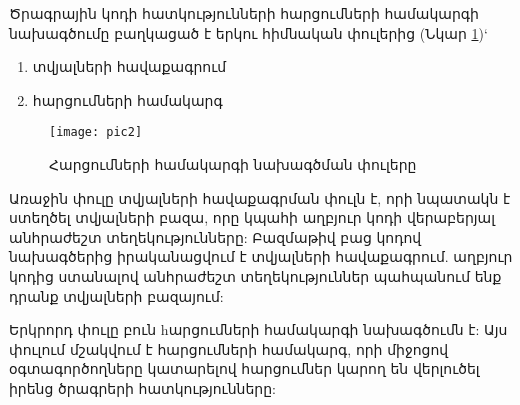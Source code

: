     {
        Ծրագրային կոդի հատկությունների հարցումների համակարգի նախագծումը բաղկացած է երկու հիմնական փուլերից (Նկար \ref{fig:figure2})`
        \begin{enumerate}
            \item տվյալների հավաքագրում
            \item հարցումների համակարգ
        \end{enumerate}

        \begin{figure}[h]
                \centering
                \texttt{[image: pic2]}
                \caption{Հարցումների համակարգի նախագծման փուլերը}
                \label{fig:figure2}
        \end{figure}

        Առաջին փուլը տվյալների հավաքագրման փուլն է, որի նպատակն է ստեղծել տվյալների բազա, որը կպահի աղբյուր կոդի
        վերաբերյալ անհրաժեշտ տեղեկությունները:
        Բազմաթիվ բաց կոդով նախագծերից իրականացվում է տվյալների հավաքագրում.
        աղբյուր կոդից ստանալով անհրաժեշտ տեղեկություններ պահպանում ենք դրանք տվյալների բազայում:

        Երկրորդ փուլը բուն hարցումների համակարգի նախագծումն է: Այս փուլում մշակվում է հարցումների համակարգ, որի միջոցով
        օգտագործողները կատարելով հարցումներ կարող են վերլուծել իրենց ծրագրերի հատկությունները:

        

        
    }
